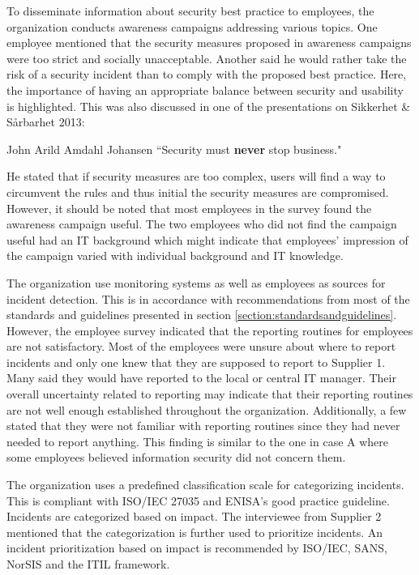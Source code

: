 To disseminate information about security best practice to employees, the organization conducts awareness campaigns addressing various topics. One employee mentioned that the security measures proposed in awareness campaigns were too strict and socially unacceptable. Another said he would rather take the risk of a security incident than to comply with the proposed best practice. Here, the importance of having an appropriate balance between security and usability is highlighted. This was also discussed in one of the presentations on Sikkerhet \& S\aa rbarhet 2013:

\begin{newquote}{John Arild Amdahl Johansen}
``Security must \textbf{never} stop business."
\end{newquote}

He stated that if security measures are too complex, users will find a way to circumvent the rules and thus initial the security measures are compromised. However, it should be noted that most employees in the survey found the awareness campaign useful. The two employees who did not find the campaign useful had an IT background which might indicate that employees' impression of the campaign varied with individual background and IT knowledge. 

The organization use monitoring systems as well as employees as sources for incident detection. This is in accordance with recommendations from most of the standards and guidelines presented in section \ref{section:standardsandguidelines}. However, the employee survey indicated that the reporting routines for employees are not satisfactory. Most of the employees were unsure about where to report incidents and only one knew that they are supposed to report to Supplier 1. Many said they would have reported to the local or central IT manager. Their overall uncertainty related to reporting may indicate that their reporting routines are not well enough established throughout the organization. Additionally, a few stated that they were not familiar with reporting routines since they had never needed to report anything. This finding is similar to the one in case A where some employees believed information security did not concern them. 

The organization uses a predefined classification scale for categorizing incidents. This is compliant with ISO/IEC 27035 and ENISA's good practice guideline. Incidents are categorized based on impact. The interviewee from Supplier 2 mentioned that the categorization is further used to prioritize incidents. An incident prioritization based on impact is recommended by ISO/IEC, SANS, NorSIS and the ITIL framework.

